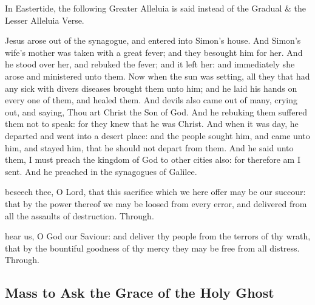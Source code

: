 \begin{rubric}
    In Eastertide, the following Greater Alleluia is said instead of the Gradual \& the Lesser Alleluia Verse.
\end{rubric}


\clearpage
{}
 Jesus arose out of the synagogue, and entered into Simon's house. And Simon's wife's mother was taken with a great fever; and they besought him for her. And he stood over her, and rebuked the fever; and it left her: and immediately she arose and ministered unto them. Now when the sun was setting, all they that had any sick with divers diseases brought them unto him; and he laid his hands on every one of them, and healed them. And devils also came out of many, crying out, and saying, Thou art Christ the Son of God. And he rebuking them suffered them not to speak: for they knew that he was Christ. And when it was day, he departed and went into a desert place: and the people sought him, and came unto him, and stayed him, that he should not depart from them. And he said unto them, I must preach the kingdom of God to other cities also: for therefore am I sent. And he preached in the synagogues of Galilee.


\secret
{} beseech thee, O Lord, that this sacrifice which we here offer may be our succour: that by the power thereof we may be loosed from every error, and delivered from all the assaults of destruction. Through.


\postcommunion
{} hear us, O God our Saviour: and deliver thy people from the terrors of thy wrath, that by the bountiful goodness of thy mercy they may be free from all distress. Through.


\clearpage
\subsection{Mass to Ask the Grace of the Holy Ghost}

